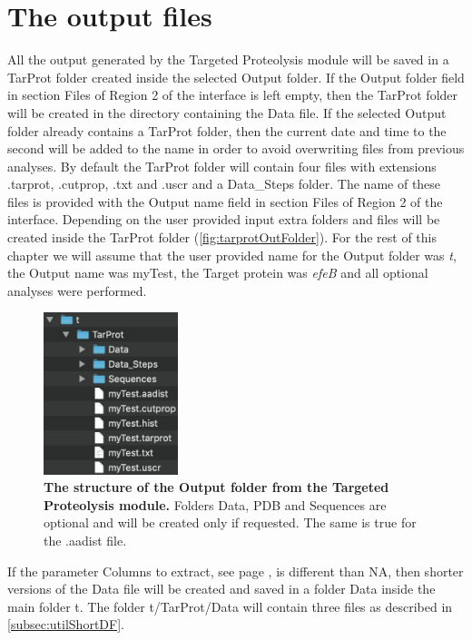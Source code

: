 \section{The output files}

All the output generated by the Targeted Proteolysis module will be saved in a TarProt folder created inside the selected Output folder. If the Output folder field in section Files of Region \num{2} of the interface is left empty, then the TarProt folder will be created in the directory containing the Data file. If the selected Output folder already contains a TarProt folder, then the current date and time to the second will be added to the name in order to avoid overwriting files from previous analyses. By default the TarProt folder will contain four files with extensions .tarprot, .cutprop, .txt and .uscr and a Data{\_}Steps folder. The name of these files is provided with the Output name field in section Files of Region \num{2} of the interface. Depending on the user provided input extra folders and files will be created inside the TarProt folder (\autoref{fig:tarprotOutFolder}). For the rest of this chapter we will assume that the user provided name for the Output folder was \textit{t}, the Output name was myTest, the Target protein was \textit{efeB} and all optional analyses were performed.

\begin{figure}[h]
    \centering
    \includegraphics[width=0.35\textwidth]{./IMAGES/MOD-TARPROT/tarprot-files.jpg}	    
    \caption[The structure of the Output folder from the Targeted Proteolysis module]{\textbf{The structure of the Output folder from the Targeted Proteolysis module.} Folders Data, PDB and Sequences are optional and will be created only if requested. The same is true for the .aadist file.} 
    \label{fig:tarprotOutFolder}
    \vspace{-5pt} 	
\end{figure} 

If the parameter Columns to extract, see page \pageref{par:tarprotColExt}, is different than NA, then shorter versions of the Data file will be created and saved in a folder Data inside the main folder t. The folder t/TarProt/Data will\label{par:tarprotDataFiles} contain three files as described in \autoref{subsec:utilShortDF}.

